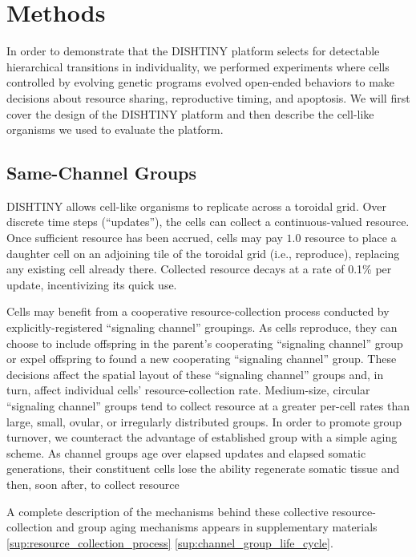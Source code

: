 \section{Methods}

In order to demonstrate that the DISHTINY platform selects for detectable hierarchical transitions in individuality, we performed experiments where cells controlled by evolving genetic programs evolved open-ended behaviors to make decisions about resource sharing, reproductive timing, and apoptosis.
We will first cover the design of the DISHTINY platform and then describe the cell-like organisms we used to evaluate the platform.

\subsection{Same-Channel Groups}

DISHTINY allows cell-like organisms to replicate across a toroidal grid.
Over discrete time steps (``updates''), the cells can collect a continuous-valued resource.
Once sufficient resource has been accrued, cells may pay $1.0$ resource to place a daughter cell on an adjoining tile of the toroidal grid (i.e., reproduce), replacing any existing cell already there.
Collected resource decays at a rate of 0.1\% per update, incentivizing its quick use.

Cells may benefit from a cooperative resource-collection process conducted by explicitly-registered ``signaling channel'' groupings.
As cells reproduce, they can choose to include offspring in the parent's cooperating ``signaling channel'' group or expel offspring to found a new cooperating ``signaling channel'' group.
These decisions affect the spatial layout of these ``signaling channel'' groups and, in turn, affect individual cells' resource-collection rate.
Medium-size, circular ``signaling channel'' groups tend to collect resource at a greater per-cell rates than large, small, ovular, or irregularly distributed groups.
In order to promote group turnover, we counteract the advantage of established group with a simple aging scheme.
As channel groups age over elapsed updates and elapsed somatic generations, their constituent cells lose the ability regenerate somatic tissue and then, soon after, to collect resource

A complete description of the mechanisms behind these collective resource-collection and group aging mechanisms appears in supplementary materials \ref{sup:resource_collection_process} \ref{sup:channel_group_life_cycle}.

